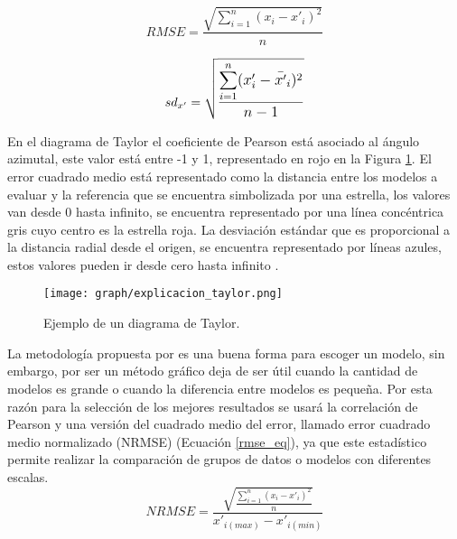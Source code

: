 \begin{equation}\label{rmse_eq_1}
RMSE =\frac{\sqrt{\sum_{i=1}^n (x_i-x'_i)^2}}{n}
\end{equation}

\begin{equation}\label{sd_eq}
sd_{x'} =\mathlarger{\sqrt{\frac{\mathlarger{\sum_{i=1}^n} (x'_i-\bar{x'}_i)^2}{n-1}}}
\end{equation}

En el diagrama de Taylor el coeficiente de Pearson está asociado al ángulo azimutal, este valor está entre -1 y 1, representado en rojo en la Figura \ref{fig_explicacion_taylor}. El error cuadrado medio está representado como la distancia entre los modelos a evaluar y la referencia que se encuentra simbolizada por una estrella, los valores van desde 0 hasta infinito, se encuentra representado por una línea concéntrica gris cuyo centro es la estrella roja. La desviación estándar que es proporcional a la distancia radial desde el origen, se encuentra representado por líneas azules, estos valores pueden ir desde cero hasta infinito \citep{taylor_diag_2018}.\\

\begin{figure}[h]
    \centering
	\caption{Ejemplo de un diagrama de Taylor.}
	\label{fig_explicacion_taylor}
	\texttt{[image: graph/explicacion\_taylor.png]}
\end{figure}

La metodología propuesta por \citet{taylor2001summarizing} es una buena forma para escoger un modelo, sin embargo, por ser un método gráfico deja de ser útil cuando la cantidad de modelos es grande o cuando la diferencia entre modelos es pequeña. Por esta razón para la selección de los mejores resultados se usará la correlación de Pearson y una versión del cuadrado medio del error, llamado error cuadrado medio normalizado (NRMSE) (Ecuación \ref{rmse_eq}), ya que este estadístico permite realizar la comparación de grupos de datos o modelos con diferentes escalas.\\

\begin{equation}\label{rmse_eq}
NRMSE =\frac{\sqrt{\frac{\sum_{i=1}^n (x_i-x'_i)^2}{n}}}{x'_{i(max)} - x'_{i(min)}}
\end{equation}

